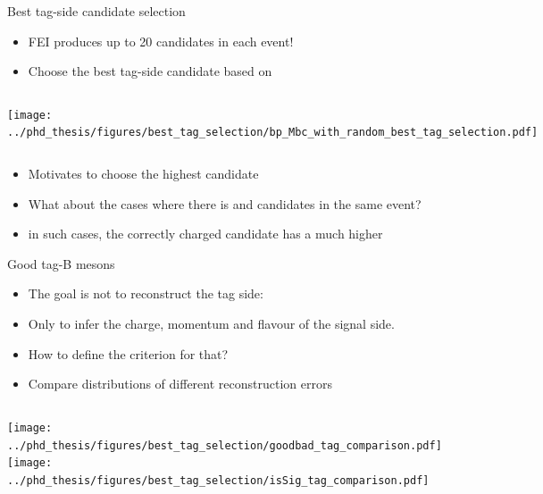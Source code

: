 \documentclass[xcolor=dvipsnames]{beamer}
\begin{document}
\begin{frame}{Best tag-side candidate selection}
\scriptsize\centering
   \begin{itemize}
      \item    FEI produces up to 20 candidates in each event!
      \item[\ra] Choose the best tag-side candidate based on \feiProb
   \end{itemize}

\begin{columns}
   \centering
   \texttt{[image: ../phd\_thesis/figures/best\_tag\_selection/bp\_Mbc\_with\_random\_best\_tag\_selection.pdf]}
   \centering

\end{columns}

\begin{itemize}
   \item Motivates to choose the highest \feiProb candidate
   \item What about the cases where there is \feiBp and \feiBz candidates in the same event?
   \item[\ra] in such cases, the correctly charged candidate has a much higher \feiProb
\end{itemize}

\end{frame}

\begin{frame}{Good tag-B mesons}
   \centering\scriptsize
   \begin{itemize}
      \item The goal is not to reconstruct the tag side:
      \item Only to infer the charge, momentum and flavour of the signal side.
      \item How to define the criterion for that?
      \item[\ra] Compare \Mbc distributions of different reconstruction errors
   \end{itemize}

   \begin{columns}
      \centering
      \texttt{[image: ../phd\_thesis/figures/best\_tag\_selection/goodbad\_tag\_comparison.pdf]}
      \centering
      \texttt{[image: ../phd\_thesis/figures/best\_tag\_selection/isSig\_tag\_comparison.pdf]}
   \end{columns}


\end{frame}
\end{document}
